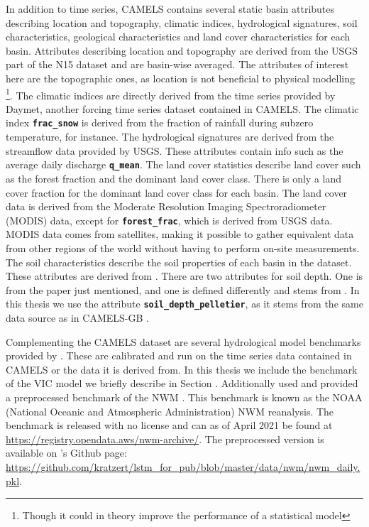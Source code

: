In addition to time series, CAMELS contains several static basin attributes describing 
location and topography, climatic indices, hydrological signatures, soil characteristics, geological 
characteristics and land cover characteristics for each basin.
Attributes describing location and topography are derived from the USGS part of 
the N15 dataset and are basin-wise averaged. The attributes of interest here are the topographic ones, as 
location is not beneficial to physical modelling \footnote{Though it could in theory 
improve the performance of a statistical model}.
The climatic indices are directly derived from the time series provided by Daymet, 
another forcing time series dataset contained in CAMELS. The climatic index
\textbf{\texttt{frac\_snow}} is derived from the fraction of rainfall during 
subzero temperature, for instance. 
The hydrological signatures are derived from the streamflow data provided by 
USGS. These attributes contain info such as the average daily discharge 
\textbf{\texttt{q\_mean}}.
The land cover statistics describe land cover such as the forest fraction and 
the dominant land cover class. There is only a land cover fraction for the dominant 
land cover class for each basin. The land cover data is derived from the 
Moderate Resolution Imaging Spectroradiometer (MODIS) data, 
except for \textbf{\texttt{forest\_frac}}, which is derived from USGS data. MODIS 
data comes from satellites, making it possible to gather equivalent data from 
other regions of the world without having to perform on-site measurements.
The soil characteristics describe the soil properties of each basin in the 
dataset. These attributes are derived from \citet{SoilData}. There are two 
attributes for soil depth. One is from the paper just mentioned, and one is defined 
differently and stems from \citet{pelletier}. In this thesis we use the attribute 
\textbf{\texttt{soil\_depth\_pelletier}}, as it stems from the same data source as 
in CAMELS-GB \citep{CAMELS_GB}.

Complementing the CAMELS dataset are several hydrological model benchmarks provided 
by \citet{CAMELS_hydroshare}. 
These are calibrated and run on the time series data contained in CAMELS or the data 
it is derived from. In this thesis we include the benchmark of the VIC model we 
briefly describe in Section \cite{VIC}. Additionally \citet{lstm_third_paper} used 
and provided a preprocessed  benchmark of the NWM \citep{NWMbench, NWMbench-paper}. 
This benchmark is known as the 
NOAA (National Oceanic and Atmospheric Administration) NWM reanalysis. The benchmark 
is released with no license and can as of April 2021  be found at 
\url{https://registry.opendata.aws/nwm-archive/}.
The preprocessed version is available on \citet{lstm_third_paper}'s 
Github page: \url{https://github.com/kratzert/lstm_for_pub/blob/master/data/nwm/nwm_daily.pkl}.


